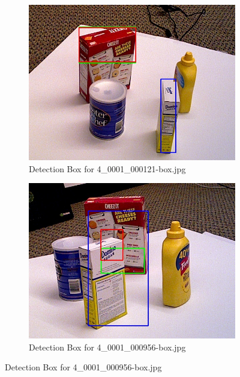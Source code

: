 \documentclass[10.5pt,a4paper]{article}
\begin{document}
\begin{figure}[h]
    \centering
    \begin{subfigure}{0.45\textwidth}
        \centering
        \includegraphics[width=\textwidth]{img/4_0001_000121-box.jpg}
        \caption{Detection Box for 4\_0001\_000121-box.jpg}
        \label{fig:img1}
    \end{subfigure}
    \hfill
    \begin{subfigure}{0.45\textwidth}
        \centering
        \includegraphics[width=\textwidth]{img/4_0001_000956-box.jpg}
        \caption{Detection Box for 4\_0001\_000956-box.jpg}
        \label{fig:img2}
    \end{subfigure}


\end{figure}
\end{document}
